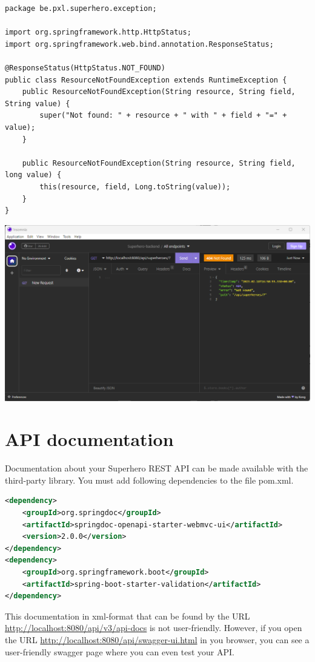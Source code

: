 \documentclass[a4paper, 12pt]{report}
\begin{document}
\begin{lstlisting}
package be.pxl.superhero.exception;

import org.springframework.http.HttpStatus;
import org.springframework.web.bind.annotation.ResponseStatus;

@ResponseStatus(HttpStatus.NOT_FOUND)
public class ResourceNotFoundException extends RuntimeException {
    public ResourceNotFoundException(String resource, String field, String value) {
        super("Not found: " + resource + " with " + field + "=" + value);
    }

    public ResourceNotFoundException(String resource, String field, long value) {
        this(resource, field, Long.toString(value));
    }
}
\end{lstlisting}

\includegraphics[width=\textwidth]{./images/chapter2/not_found_2.png}

\section{API documentation}

Documentation about your Superhero REST API can be made available with the third-party library. You must add following dependencies to the file pom.xml.

\begin{lstlisting}[language=xml]
<dependency>
	<groupId>org.springdoc</groupId>
	<artifactId>springdoc-openapi-starter-webmvc-ui</artifactId>
	<version>2.0.0</version>
</dependency>
<dependency>
	<groupId>org.springframework.boot</groupId>
	<artifactId>spring-boot-starter-validation</artifactId>
</dependency>
\end{lstlisting}

This documentation in xml-format that can be found by the URL \url{http://localhost:8080/api/v3/api-docs} is not user-friendly.  However, if you open the URL \url{http://localhost:8080/api/swagger-ui.html} in you browser, you can see a user-friendly swagger page where you can even test your API.
\end{document}
